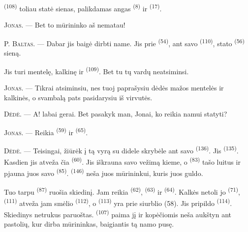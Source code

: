  \textsuperscript{(108)} toliau statė sienas, palikdamas angas
 \textsuperscript{(8)} ir  \textsuperscript{(17)}.

\textsc{Jonas}. --- Bet to mūrininko aš nematau!

P. \textsc{Baltas}. --- Dabar jis baigė dirbti name. Jis prie 
\textsuperscript{(54)}, ant savo  \textsuperscript{(110)}, stato
 \textsuperscript{(56)} sieną.

Jis turi mentelę, kalkinę ir  \textsuperscript{(109)}. Bet tu tų
vardų neatsiminsi.

\textsc{Jonas}. --- Tikrai atsiminsiu, nes tuoj paprašysiu dėdės mažos mentelės ir
kalkinės, o svambalą pats pasidarysiu iš virvutės.

\VUsaut{3.0mm}
\VUsaut{3.0mm}

\textsc{Dėdė}. --- A! labai gerai. Bet pasakyk man, Jonai, ko reikia namui statyti?

\textsc{Jonas}. --- Reikia  \textsuperscript{(59)} ir
 \textsuperscript{(65)}.

\textsc{Dėdė}. --- Teisingai, žiūrėk į tą vyrą su didele skrybėle ant savo
 \textsuperscript{(136)}. Jis  \textsuperscript{(135)}.
Kasdien jis atveža čia  \textsuperscript{(60)}. Jis iškrauna
savo vežimą kieme, o  \textsuperscript{(83)} tašo luitus ir
pjauna juos savo  \textsuperscript{(85)}. 
\textsuperscript{(146)} neša juos mūrininkui, kuris juos guldo.

Tuo tarpu  \textsuperscript{(87)} ruošia skiedinį. Jam reikia
 \textsuperscript{(62)},  \textsuperscript{(63)} ir
 \textsuperscript{(64)}. Kalkės netoli jo 
\textsuperscript{(71)},  \textsuperscript{(111)} atveža jam
smėlio  \textsuperscript{(112)}, o 
\textsuperscript{(113)} yra prie siurblio (58). Jis pripildo 
\textsuperscript{(114)}. Skiedinys netrukus paruoštas. 
\textsuperscript{(107)} paima jį ir kopėčiomis neša aukštyn ant pastolių, kur dirba
mūrininkas, baigiantis tą namo pusę.

